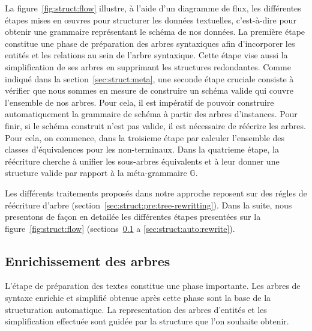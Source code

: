 La figure~\ref{fig:struct:flow} illustre, à l'aide d'un diagramme de flux, les différentes étapes mises en œuvres pour structurer les données textuelles, c'est-à-dire pour obtenir une grammaire représentant le schéma de nos données.
La première étape constitue une phase de préparation des arbres syntaxiques afin d'incorporer les entités et les relations au sein de l'arbre syntaxique.
Cette étape vise aussi la simplification de ses arbres en supprimant les structures redondantes.
Comme indiqué dans la section~\ref{sec:struct:meta}, une seconde étape cruciale consiste à vérifier que nous sommes en mesure de construire un schéma valide qui couvre l'ensemble de nos arbres.
Pour cela, il est impératif de pouvoir construire automatiquement la grammaire de schéma à partir des arbres d'instances.
Pour finir, si le schéma construit n'est pas valide, il est nécessaire de réécrire les arbres.
Pour cela, on commence, dans la troisieme étape par calculer l'ensemble des classes d'équivalences pour les non-terminaux.
Dans la quatrieme étape, la réécriture cherche à unifier les sous-arbres équivalents et à leur donner une structure valide par rapport à la méta-grammaire $\mathbb{G}$.

Les différents traitements proposés dans notre approche reposent sur des régles de réécriture d'arbre (section~\ref{sec:struct:pre:tree-rewritting}).
Dans la suite, nous presentons de façon en detailée les différentes étapes presentées sur la figure~\ref{fig:struct:flow} (sections~\ref{sec:struct:auto:text} a \ref{sec:struct:auto:rewrite}).

\subsection{Enrichissement des arbres}
\label{sec:struct:auto:text}
L'étape de préparation des textes constitue une phase importante.
Les arbres de syntaxe enrichie et simplifié obtenue après cette phase sont la base de la structuration automatique.
La representation des arbres d'entités et les simplification effectuée sont guidée par la structure que l'on souhaite obtenir.

